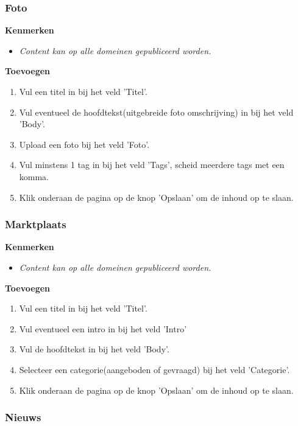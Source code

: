 \subsubsection{Foto}\label{foto}

\textbf{Kenmerken}

\begin{itemize}
\item \emph{Content kan op alle domeinen gepubliceerd worden.}
\end{itemize}

\textbf{Toevoegen}

\begin{enumerate}
\item Vul een titel in bij het veld 'Titel'.
\item Vul eventueel de hoofdtekst(uitgebreide foto omschrijving) in bij het veld 'Body'.
\item Upload een foto bij het veld 'Foto'.
\item Vul minstens 1 tag in bij het veld 'Tags', scheid meerdere tags met een komma.
\item Klik onderaan de pagina op de knop 'Opslaan' om de inhoud op te slaan.
\end{enumerate}

\subsubsection{Marktplaats}\label{marktplaats}

\textbf{Kenmerken}

\begin{itemize}
\item \emph{Content kan op alle domeinen gepubliceerd worden.}
\end{itemize}

\textbf{Toevoegen}

\begin{enumerate}
\item Vul een titel in bij het veld 'Titel'.
\item Vul eventueel een intro in bij het veld 'Intro'
\item Vul de hoofdtekst in bij het veld 'Body'.
\item Selecteer een categorie(aangeboden of gevraagd) bij het veld 'Categorie'.
\item Klik onderaan de pagina op de knop 'Opslaan' om de inhoud op te slaan.
\end{enumerate}

\subsubsection{Nieuws}\label{nieuws}


